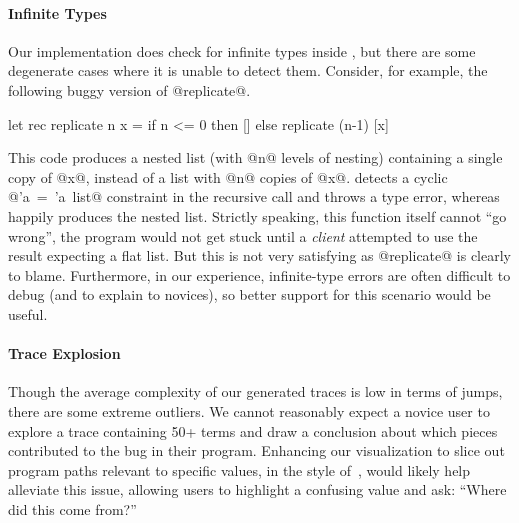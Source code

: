 \paragraph{Infinite Types}
Our implementation does check for infinite types inside \forcesym, but
there are some degenerate cases where it is unable to detect
them. Consider, for example, the following buggy version of @replicate@.
%
\begin{code}
  let rec replicate n x =
    if n <= 0 then 
      []
    else 
      replicate (n-1) [x]
\end{code}
%
This code produces a nested list (with @n@ levels of nesting) containing
a single copy of @x@, instead of a list with @n@ copies of @x@. \ocaml
detects a cyclic \hbox{@'a = 'a list@} constraint in the recursive call
and throws a type error, whereas \nanomaly happily %
produces the nested list.  Strictly speaking, this function itself cannot
``go wrong'', the program would not get stuck until a \emph{client}
attempted to use the result expecting a flat list. But this is not very
satisfying as @replicate@ is clearly to blame. Furthermore, in our
experience, infinite-type errors are often difficult to %
debug (and to explain to novices), so better support for this scenario
would be useful.

\paragraph{Trace Explosion}
Though the average complexity of our generated traces is low in terms of
jumps, there are some extreme outliers. We cannot reasonably expect a
novice user to explore a trace containing 50+ terms and draw a
conclusion about which pieces contributed to the bug in their
program. Enhancing our visualization to slice out program paths relevant
to specific values, \eg in the style of~\cite{perera_functional_2012},
would likely help alleviate this issue, allowing users to
highlight a confusing value and ask: ``Where did this come from?''



